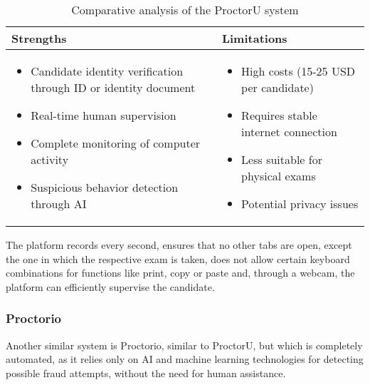 \documentclass[12pt,a4paper]{article}
\begin{document}
\begin{table}[h]
\centering
\begin{tabular}{|p{7.5cm}|p{7.5cm}|}
\hline
\textbf{Strengths} & \textbf{Limitations} \\
\hline
\begin{itemize}
    \item Candidate identity verification through ID or identity document
    \item Real-time human supervision
    \item Complete monitoring of computer activity
    \item Suspicious behavior detection through AI
\end{itemize} & 
\begin{itemize}
    \item High costs (15-25 USD per candidate)
    \item Requires stable internet connection
    \item Less suitable for physical exams
    \item Potential privacy issues
\end{itemize} \\
\hline
\end{tabular}
\caption{Comparative analysis of the ProctorU system}
\end{table}

\newpage

The platform records every second, ensures that no other tabs are
open, except the one in which the respective exam is taken,
does not allow certain keyboard combinations for functions like 
print, copy or paste and, through a webcam, the platform can 
efficiently supervise the candidate.

\subsubsection{Proctorio}
Another similar system is Proctorio, similar to
ProctorU, but which is completely automated, as it relies only
on AI and machine learning technologies for detecting possible
fraud attempts, without the need for human assistance.
\end{document}
